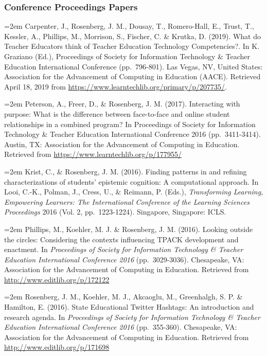 \documentclass[14,]{article}
\begin{document}
\hypertarget{conference-proceedings-papers}{%
\subsubsection{Conference Proceedings
Papers}\label{conference-proceedings-papers}}

\hangindent=2em Carpenter, J., Rosenberg, J. M., Dousay, T.,
Romero-Hall, E., Trust, T., Kessler, A., Phillips, M., Morrison, S.,
Fischer, C. \& Krutka, D. (2019). What do Teacher Educators think of
Teacher Education Technology Competencies?. In K. Graziano (Ed.),
Proceedings of Society for Information Technology \& Teacher Education
International Conference (pp.~796-801). Las Vegas, NV, United States:
Association for the Advancement of Computing in Education (AACE).
Retrieved April 18, 2019 from
\url{https://www.learntechlib.org/primary/p/207735/}.

\hangindent=2em Peterson, A., Freer, D., \& Rosenberg, J. M. (2017).
Interacting with purpose: What is the difference between face-to-face
and online student relationships in a combined program? In Proceedings
of Society for Information Technology \& Teacher Education International
Conference 2016 (pp.~3411-3414). Austin, TX: Association for the
Advancement of Computing in Education. Retrieved from
\url{https://www.learntechlib.org/p/177955/}

\hangindent=2em Krist, C., \& Rosenberg, J. M. (2016). Finding patterns
in and refining characterizations of students' epistemic cognition: A
computational approach. In Looi, C.-K., Polman, J., Cress, U., \&
Reimann, P. (Eds.), \emph{Transforming Learning, Empowering Learners:
The International Conference of the Learning Sciences Proceedings} 2016
(Vol. 2, pp.~1223-1224). Singapore, Singapore: ICLS.

\hangindent=2em Phillips, M., Koehler, M. J. \& Rosenberg, J. M. (2016).
Looking outside the circles: Considering the contexts influencing TPACK
development and enactment. In \emph{Proceedings of Society for
Information Technology \& Teacher Education International Conference
2016} (pp.~3029-3036). Chesapeake, VA: Association for the Advancement
of Computing in Education. Retrieved from
\url{http://www.editlib.org/p/172122}

\hangindent=2em Rosenberg, J. M., Koehler, M. J., Akcaoglu, M.,
Greenhalgh, S. P. \& Hamilton, E. (2016). State Educational Twitter
Hashtags: An introduction and research agenda. In \emph{Proceedings of
Society for Information Technology \& Teacher Education International
Conference 2016} (pp.~355-360). Chesapeake, VA: Association for the
Advancement of Computing in Education. Retrieved from
\url{http://www.editlib.org/p/171698}
\end{document}
